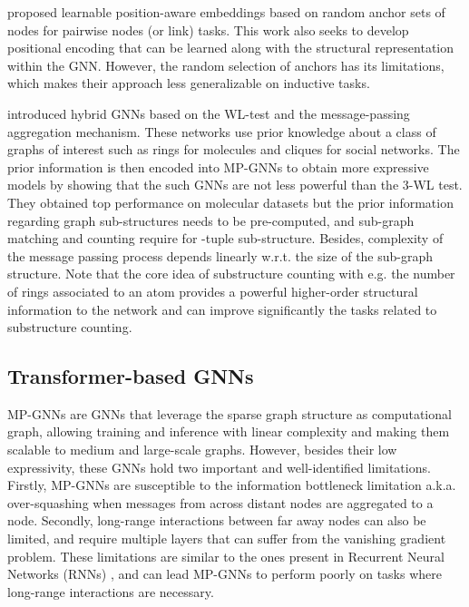 \documentclass{article} \usepackage{iclr2021_conference,times}
\begin{document}
\cite{you2019position} proposed learnable position-aware embeddings based on random anchor sets of nodes for pairwise nodes (or link) tasks. This work also seeks to develop positional encoding that can be learned along with the structural representation within the GNN. However, the random selection of anchors  has its limitations, which makes their approach less generalizable on inductive tasks.


\cite{bouritsas2020improving,bodnar2021weisfeiler} introduced hybrid GNNs based on the WL-test and the message-passing 
aggregation
mechanism. These networks use prior knowledge about a class of graphs of interest such as rings for molecules and cliques for social networks. The prior information is then encoded into MP-GNNs to obtain more expressive models by showing that the such GNNs are not less powerful than the 3-WL test. They obtained top performance on molecular datasets but the prior information regarding graph sub-structures needs to be pre-computed, and sub-graph matching and counting require  for -tuple sub-structure. Besides, complexity of the message passing process depends linearly w.r.t. the size of the sub-graph structure. Note that the core idea of substructure counting with e.g. the number of rings associated to an atom provides a powerful higher-order structural information to the network and can improve significantly the tasks related to substructure counting.




\subsection{Transformer-based GNNs}
\label{sec:related_work_transfGNNs}

MP-GNNs are GNNs that leverage the sparse graph structure as computational graph, allowing training and inference with linear complexity and making them scalable to medium and large-scale graphs. However, besides their low expressivity, these GNNs hold two important and well-identified limitations. Firstly, MP-GNNs are susceptible to the information bottleneck limitation a.k.a. over-squashing \citep{alon2020bottleneck} when messages from across distant nodes are aggregated to a node. Secondly, long-range interactions between far away nodes can also be limited, and require multiple layers that can suffer from the vanishing gradient problem. These limitations are similar to the ones present in Recurrent Neural Networks (RNNs) \citep{hochreiter1997long}, and can lead MP-GNNs to perform poorly on tasks where long-range interactions are necessary. 
\end{document}
